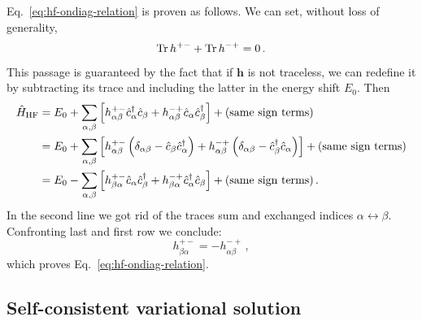 \begin{tabproof}
	Eq.~\eqref{eq:hf-ondiag-relation} is proven as follows. We can set, without loss of generality,
	\[
		\Tr h^{+-} + \Tr h^{-+} = 0 \, .
	\]
	This passage is guaranteed by the fact that if $\mathbf{h}$ is not traceless, we can redefine it by subtracting its trace and including the latter in the energy shift $E_0$. Then
	\[
	\begin{aligned}
		\hat H_\mathrm{HF} &= E_0 + \sum_{\alpha,\beta} \left[
			h_{\alpha\beta}^{+-} \hat c_\alpha^\dagger \hat c_\beta + h_{\alpha\beta}^{-+} \hat c_\alpha \hat c_\beta^\dagger
		\right] + (\text{same sign terms}) \\
		&= E_0 + \sum_{\alpha,\beta} \left[
			h_{\alpha\beta}^{+-} \left(\delta_{\alpha\beta} - \hat c_\beta \hat c_\alpha^\dagger \vphantom{c_\beta^\dagger} \right) + h_{\alpha\beta}^{-+} \left(\delta_{\alpha\beta} - \hat c_\beta^\dagger \hat c_\alpha\right)
		\right] + (\text{same sign terms}) \\
		&= E_0 -\sum_{\alpha,\beta} \left[
			h_{\beta\alpha}^{+-} \hat c_\alpha \hat c_\beta^\dagger + h_{\beta\alpha}^{-+} \hat c_\alpha^\dagger \hat c_\beta
		\right] + (\text{same sign terms}) \, .
	\end{aligned}
	\]
	In the second line we got rid of the traces sum and exchanged indices $\alpha \leftrightarrow \beta$. Confronting last and first row we conclude:
	\[
		h_{\beta\alpha}^{+-} = - h_{\alpha\beta}^{-+} \, ,
	\]
	which proves Eq.~\eqref{eq:hf-ondiag-relation}.
\end{tabproof}

\subsection{Self-consistent variational solution}\label{subsec:hf-variational-solution}

